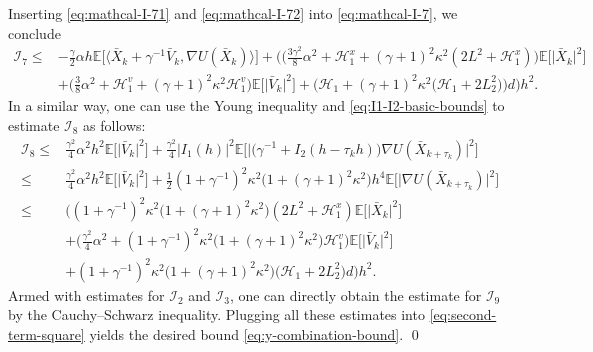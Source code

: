 \documentclass[12pt]{article}
\numberwithin{equation}{section}
\renewenvironment{proof}%
  {\begin{trivlist}%
   \item[]\ignorespaces}%
  {\qed\end{trivlist}}
\renewcommand{\H}{\mathcal{H}}
\begin{document}
\begin{proof}
\begin{equation}
\end{equation}
Inserting \eqref{eq:mathcal-I-71} and \eqref{eq:mathcal-I-72} into 
\eqref{eq:mathcal-I-7}, we conclude
\begin{equation}
\begin{aligned}
\mathcal  I_{7}
\leq    &
-
\tfrac{\gamma}{2}
\alpha  h
\mathbb{E}
\Big[
\Big\langle
\bar{X}_k
+
\gamma^{-1}\bar{V}_k,
\nabla U(\bar{X}_{k})
\Big\rangle
\Big]
+
\Big(
\big(
\tfrac{3\gamma^2}{8}
\alpha^2
+
\H^{x}_1
+
(\gamma +  1)^2 \kappa^2 
(2 L^2
+
\H^{x}_1)
\big)
\mathbb{E}
\Big[\big|
\bar{X}_k
\big|^2\Big]
\\   &
+
\big(
\tfrac{3}{8}
\alpha^2
+
\H^{v}_1
+
(\gamma +  1)^2 \kappa^2 
\H^{v}_1
\big)
\mathbb{E}
\Big[\big|
\bar{V}_k
\big|^2\Big]
+
\big(
\H_1
+
(\gamma +  1)^2 \kappa^2
\big( 
\H_1  +  
2 L_2^2 
\big)
\big)
d
\Big)  
h^2.
\end{aligned}
\end{equation}
In a similar way, one can use the Young inequality and \eqref{eq:I1-I2-basic-bounds} to estimate $\mathcal I_8$ as follows:
\begin{equation}
\begin{aligned}
\mathcal  I_8 
\leq   &
\tfrac{\gamma^2}{4}
\alpha^2  h^2
\mathbb{E}
\Big[\big|
\bar{V}_k
\big|^2\Big]
+
\tfrac{\gamma^2}{4}
|  I_1(h)  |^2
\mathbb{E}
\Big[
\big|
\big(
\gamma^{-1}
+
I_{2} (h-\tau_kh)
\big)
\nabla U(\bar{X}_{k+\tau_k})
\big|^2
\Big]
\\  
\leq   &
\tfrac{\gamma^2}{4}
\alpha^2  h^2
\mathbb{E}
\Big[\big|
\bar{V}_k
\big|^2\Big]
+
\tfrac{1}{2}
(1  +  \gamma^{-1})^2
\kappa^2 
\big(
1
+
( \gamma +1 )^2 
\kappa^2
\big)
h^4
\mathbb{E}
\Big[
\big|
\nabla U(\bar{X}_{k+\tau_k})
\big|^2 
\Big]
\\  
\leq   &
\Big(
(1  +  \gamma^{-1})^2
\kappa^2 
\big(
1
+
( \gamma +1 )^2 
\kappa^2
\big)
(2 L^2
+
\H^{x}_1)
\mathbb{E}
\Big[\big|
\bar{X}_k
\big|^2\Big]
\\   &  
+
\big(
\tfrac{\gamma^2}{4}
\alpha^2
+
(1  +  \gamma^{-1})^2
\kappa^2 
\big(
1
+
( \gamma +1 )^2 
\kappa^2
\big)
\H^{v}_1
\big)
\mathbb{E}
\Big[\big|
\bar{V}_k
\big|^2\Big]
\\   &
+
(1  +  \gamma^{-1})^2
\kappa^2 
\big(
1
+
( \gamma +1 )^2 
\kappa^2
\big)
\big( 
\H_1  +  
2 L_2^2 
\big)
d
\Big) 
h^2.
\end{aligned}
\end{equation}
Armed with estimates for $\mathcal I_2$ and $\mathcal I_3$, one can directly obtain the estimate for $\mathcal I_9$ by the Cauchy--Schwarz inequality.
Plugging all these estimates into \eqref{eq:second-term-square} yields the desired bound \eqref{eq:y-combination-bound}.
\end{proof}
\end{document}
